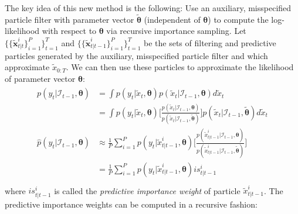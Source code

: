 \documentclass[11pt, oneside]{scrreprt}   	%
\begin{document}
The key idea of this new method is the following: Use an auxiliary, misspecified particle filter with parameter vector $\boldsymbol{\tilde{\theta}}$ (independent of $\boldsymbol{\theta}$) to compute the log-likelihood with respect to $\boldsymbol{\theta}$ via recursive importance sampling. 
Let $\{\{\boldsymbol{\tilde{x}}_{t | t}^i\}_{i=1}^P\}_{t=1}^T$ and $\{\{\boldsymbol{\tilde{x}}_{t | t-1}^i\}_{i=1}^P\}_{t=1}^T$ be the sets of filtering and predictive particles generated by the auxiliary, misspecified particle filter and which approximate $\tilde{x}_{0:T}$.
We can then use these particles to approximate the likelihood of parameter vector $\boldsymbol{\theta}$: 
\begin{align*} 
\begin{split}
p(y_t | \mathcal{I}_{t-1}, \boldsymbol{\theta}) &= \int p(y_t | \tilde{x}_t, \boldsymbol{\theta}) p(\tilde{x}_t | \mathcal{I}_{t-1}, \boldsymbol{\theta}) d \tilde{x}_t \\
&= \int p(y_t | \tilde{x}_t, \boldsymbol{\theta}) \bigg[ \frac{p(\tilde{x}_t | \mathcal{I}_{t-1}, \boldsymbol{\theta})}{p(\tilde{x}_t | \mathcal{I}_{t-1}, \boldsymbol{\tilde{\theta}})} \bigg] p(\tilde{x}_t | \mathcal{I}_{t-1}, \boldsymbol{\tilde{\theta}}) d \tilde{x}_t \\
\hat{p}(y_t | \mathcal{I}_{t-1}, \boldsymbol{\theta}) &\approx \frac{1}{P} \sum_{i=1}^P p(y_t | \tilde{x}_{t|t-1}^i, \boldsymbol{\theta})  \bigg[ \frac{p(\tilde{x}_{t|t-1}^i | \mathcal{I}_{t-1}, \boldsymbol{\theta})}{p(\tilde{x}_{t|t-1}^i | \mathcal{I}_{t-1}, \boldsymbol{\tilde{\theta}})} \bigg] \\
&= \frac{1}{P} \sum_{i=1}^P p(y_t | \tilde{x}_{t|t-1}^i, \boldsymbol{\theta}) is_{t|t-1}^i \\
\end{split}					
\end{align*}  
where $is_{t|t-1}^i$ is called the \textit{predictive importance weight} of particle $\tilde{x}_{t|t-1}^i$. The predictive importance weights can be computed in a recursive fashion:
\end{document}
